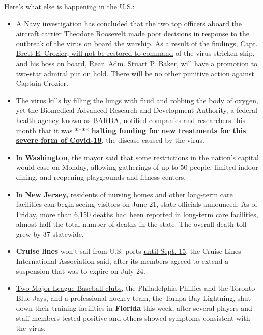 Here's what else is happening in the U.S.:

\begin{itemize}
\item
  A Navy investigation has concluded that the two top officers aboard
  the aircraft carrier Theodore Roosevelt made poor decisions in
  response to the outbreak of the virus on board the warship. As a
  result of the findings,
  \href{https://www.nytimes3xbfgragh.onion/2020/06/19/us/politics/carrier-roosevelt-coronavirus-crozier.html}{Capt.
  Brett E. Crozier, will not be restored to command} of the
  virus-stricken ship, and his boss on board, Rear. Adm. Stuart P.
  Baker, will have a promotion to two-star admiral put on hold. There
  will be no other punitive action against Captain Crozier.
\item
  The virus kills by filling the lungs with fluid and robbing the body
  of oxygen, yet the Biomedical Advanced Research and Development
  Authority, a federal health agency known as
  \href{https://medicalcountermeasures.gov/app/barda/coronavirus/COVID19.aspx}{BARDA},
  notified companies and researchers this month that it was ****
  \textbf{\href{https://www.nytimes3xbfgragh.onion/2020/06/19/health/coronavirus-lung-treatment-funding.html}{halting
  funding for new treatments for this severe form of Covid-19}}, the
  disease caused by the virus.
\end{itemize}

\begin{itemize}
\tightlist
\item
  In \textbf{Washington}, the mayor said that some restrictions in the
  nation's capital would ease on Monday, allowing gatherings of up to 50
  people, limited indoor dining, and reopening playgrounds and fitness
  centers.
\end{itemize}

\begin{itemize}
\item
  In \textbf{New Jersey,} residents of nursing homes and other long-term
  care facilities can begin seeing visitors on June 21, state officials
  announced. As of Friday, more than 6,150 deaths had been reported in
  long-term care facilities, almost half the total number of deaths in
  the state. The overall death toll grew by 37 statewide.
\item
  \textbf{Cruise lines} won't sail from U.S. ports
  \href{https://cruising.org/news-and-research/press-room/2020/june/clia-announces-voluntary-suspension-of-cruise-operations-from-us-ports}{until
  Sept. 15}, the Cruise Lines International Association said, after its
  members agreed to extend a suspension that was to expire on July 24.
\item
  \href{https://www.nytimes3xbfgragh.onion/2020/06/19/sports/phillies-blue-jays-coronavirus-mlb.html}{Two
  Major League Baseball clubs}, the Philadelphia Phillies and the
  Toronto Blue Jays, and a professional hockey team, the Tampa Bay
  Lightning, shut down their training facilities in \textbf{Florida}
  this week, after several players and staff members tested positive and
  others showed symptoms consistent with the virus.
\end{itemize}

